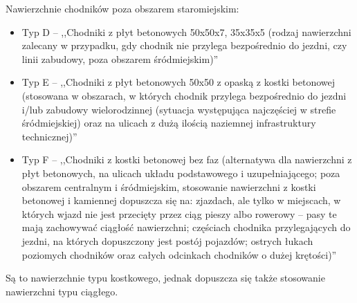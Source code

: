 \documentclass[twoside,12pt]{article}
\begin{document}
	 \begin{samepage}
Nawierzchnie chodników poza obszarem staromiejskim:
	 \begin{itemize}\setlength{\itemsep}{0em}
	 \item Typ D -- ,,Chodniki z płyt betonowych 50x50x7, 35x35x5 (rodzaj nawierzchni zalecany w przypadku, gdy chodnik nie przylega bezpośrednio do jezdni, czy linii zabudowy, poza obszarem śródmiejskim)'' \cite{standardy_wroclaw}
	 \item Typ E -- ,,Chodniki z płyt betonowych 50x50 z opaską z kostki betonowej (stosowana w obszarach, w których chodnik przylega bezpośrednio do jezdni i/lub zabudowy wielorodzinnej (sytuacja występująca najczęściej w strefie śródmiejskiej) oraz na ulicach z dużą ilością naziemnej infrastruktury technicznej)'' \cite{standardy_wroclaw}
	 \item Typ F -- ,,Chodniki z kostki betonowej bez faz (alternatywa dla nawierzchni z płyt betonowych, na ulicach układu podstawowego i uzupełniającego; poza obszarem centralnym i śródmiejskim, stosowanie nawierzchni z kostki betonowej i kamiennej dopuszcza się na:
zjazdach, ale tylko w miejscach, w których wjazd nie jest przecięty przez ciąg pieszy albo rowerowy -- pasy te mają zachowywać ciągłość nawierzchni; częściach chodnika przylegających do jezdni, na których dopuszczony jest postój pojazdów; ostrych łukach poziomych chodników oraz całych odcinkach chodników o dużej krętości)'' \cite{standardy_wroclaw}
	 \end{itemize}\end{samepage}
	 
	 Są to nawierzchnie typu kostkowego, jednak dopuszcza się także stosowanie nawierzchni typu ciągłego.
	 
\end{document}
